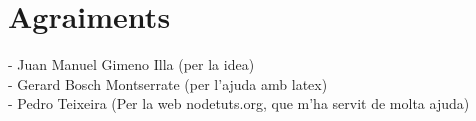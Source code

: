 \chapter*{Agraiments}

- Juan Manuel Gimeno Illa (per la idea) \\
- Gerard Bosch Montserrate (per l'ajuda amb latex) \\
- Pedro Teixeira (Per la web nodetuts.org, que m'ha servit de molta ajuda) \\
